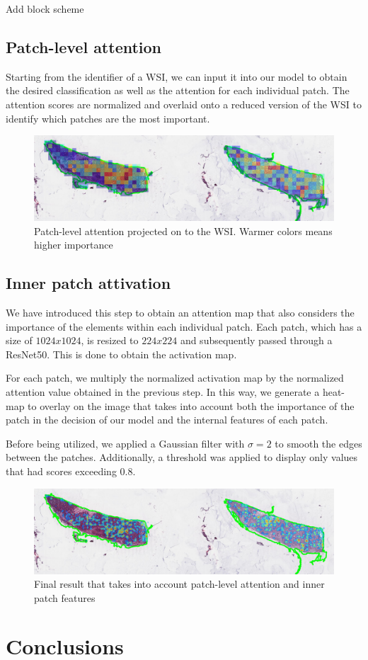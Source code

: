 \documentclass{article}
\begin{document}
Add block scheme

\subsection{Patch-level attention}

Starting from the identifier of a WSI, we can input it into our model to obtain the desired classification as well as the attention for each individual patch. The attention scores are normalized and overlaid onto a reduced version of the WSI to identify which patches are the most important.

\begin{figure}[h]
	\centering
	\includegraphics[width=1\textwidth]{images/old_attention_map_val.png}
	\caption{Patch-level attention projected on to the WSI. Warmer colors means higher importance}
\end{figure}


\subsection{Inner patch attivation}
We have introduced this step to obtain an attention map that also considers the importance of the elements within each individual patch. Each patch, which has a size of $1024x1024$, is resized to $224x224$ and subsequently passed through a ResNet50. This is done to obtain the activation map.

For each patch, we multiply the normalized activation map by the normalized attention value obtained in the previous step. In this way, we generate a heat-map to overlay on the image that takes into account both the importance of the patch in the decision of our model and the internal features of each patch.

Before being utilized, we applied a Gaussian filter with $\sigma =2$ to smooth the edges between the patches. Additionally, a threshold was applied to display only values that had scores exceeding $0.8$.
 
\begin{figure}[h]
	\centering
	\includegraphics[width=1\textwidth]{images/attention_map_val.png}
	\caption{Final result that takes into account patch-level attention and inner patch features}
\end{figure}

\newpage

\section{Conclusions}
\end{document}
